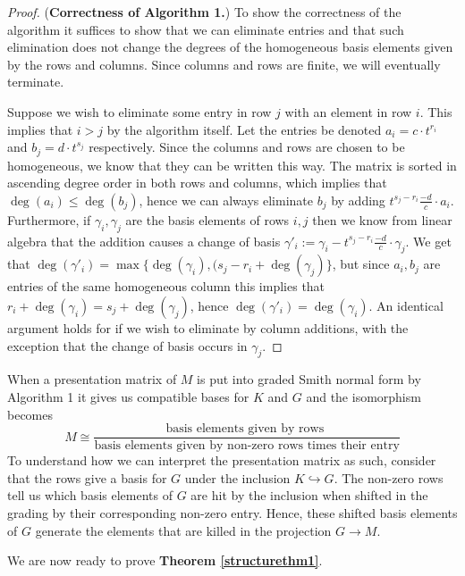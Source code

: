 \begin{proof}(\textbf{Correctness of Algorithm 1.})
  To show the correctness of the algorithm it suffices to show that we can eliminate entries and that such elimination does not change the degrees of the homogeneous basis elements given by the rows and columns. Since columns and rows are finite, we will eventually terminate.

  Suppose we wish to eliminate some entry in row $j$ with an element in row $i$. This implies that $ i > j$ by the algorithm itself. Let the entries be denoted $a_{i}= c \cdot t^{r_{i}}$ and $b_{j} = d \cdot t^{s_{j}}$ respectively. Since the columns and rows are chosen to be homogeneous, we know that they can be written this way. The matrix is sorted in ascending degree order in both rows and columns, which implies that $\deg(a_{i}) \leq \deg(b_{j})$, hence we can always eliminate $b_{j}$ by adding $t^{s_{j}-r_{i}} \frac{-d}{c} \cdot a_{i}$. Furthermore, if $\gamma_{i},\gamma_{j}$ are the basis elements of rows $i,j$ then we know from linear algebra that the addition causes a change of basis $\gamma'_{i}:=\gamma_{i}-t^{s_{j}-r_{i}} \frac{-d}{c} \cdot \gamma_{j}$. We get that $\deg(\gamma'_{i})=\max\{\deg(\gamma_{i}), (s_{j}-r_{i}+\deg(\gamma_{j})\}$, but since $a_{i},b_{j}$ are entries of the same homogeneous column this implies that $r_{i} + \deg(\gamma_{i}) = s_{j} + \deg(\gamma_{j})$, hence $\deg(\gamma'_{i}) = \deg(\gamma_{i})$. An identical argument holds for if we wish to eliminate by column additions, with the exception that the change of basis occurs in $\gamma_{j}$.
\end{proof}
\clearpage
When a presentation matrix of $M$ is put into graded Smith normal form by Algorithm 1 it gives us compatible bases for $K$ and $G$ and the isomorphism becomes \[M\cong \frac{\text{basis  elements given by rows  }}{\text{basis elements given by non-zero rows times their entry}}\]
To understand how we can interpret the presentation matrix as such, consider that the rows give a basis for $G$ under the inclusion $K \hookrightarrow G$. The non-zero rows tell us which basis elements of $G$ are hit by the inclusion when shifted in the grading by their corresponding non-zero entry. Hence, these shifted basis elements of $G$ generate the elements that are killed in the projection $G \to M$.

We are now ready to prove \textbf{Theorem \ref{structurethm1}}.

